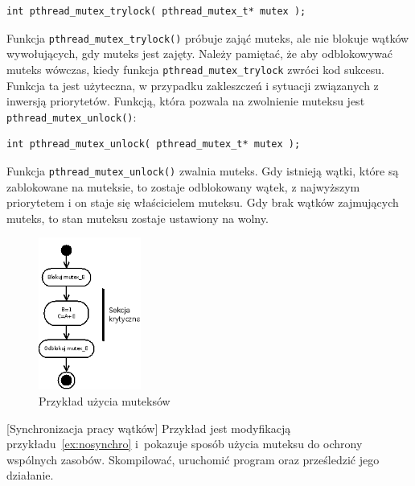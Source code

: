 \begin{lstlisting}[style=MyCStyle]
int pthread_mutex_trylock( pthread_mutex_t* mutex );
\end{lstlisting}

Funkcja \lstinline[style=MyCStyle]{pthread_mutex_trylock()} próbuje zająć muteks, ale nie blokuje wątków wywołujących, gdy muteks jest zajęty. Należy pamiętać, że aby odblokowywać muteks wówczas, kiedy funkcja \lstinline[style=MyCStyle]{pthread_mutex_trylock} zwróci kod sukcesu. Funkcja ta jest użyteczna, w przypadku zakleszczeń i sytuacji związanych z inwersją priorytetów. Funkcją, która pozwala na zwolnienie muteksu jest \lstinline[style=MyCStyle]{pthread_mutex_unlock()}:

\begin{lstlisting}[style=MyCStyle]
int pthread_mutex_unlock( pthread_mutex_t* mutex );
\end{lstlisting}

Funkcja \lstinline[style=MyCStyle]{pthread_mutex_unlock()} zwalnia muteks. Gdy istnieją wątki, które są zablokowane na muteksie, to zostaje odblokowany wątek, z najwyższym priorytetem i on staje się właścicielem muteksu. Gdy brak wątków zajmujących muteks, to stan muteksu zostaje ustawiony na wolny. 

\begin{figure}[!h]
\centering
\includegraphics[width=0.3\textwidth]{img/thrd_mutex}
\caption{Przykład użycia muteksów}
\label{fig:mutex}
\end{figure}

\begin{example}{[Synchronizacja pracy wątków]}
Przykład jest modyfikacją przykładu~\ref{ex:nosynchro} i~pokazuje sposób użycia muteksu do ochrony wspólnych zasobów. Skompilować, uruchomić program oraz prześledzić jego działanie. 


\end{example}

